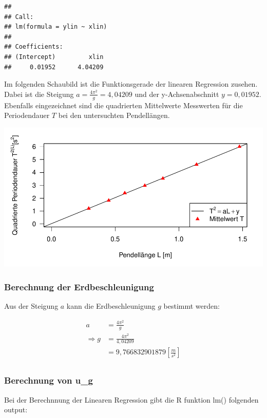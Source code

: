 \documentclass[
  9pt,
]{article}
\begin{document}
\begin{verbatim}
## 
## Call:
## lm(formula = ylin ~ xlin)
## 
## Coefficients:
## (Intercept)         xlin  
##     0.01952      4.04209
\end{verbatim}

Im folgenden Schaubild ist die Funktionsgerade der linearen Regression
zusehen. Dabei ist die Steigung \(a=\frac{4\pi^2}{g}=4,04209\) und der
y-Achsenabschnitt \(y=0,01952\). Ebenfalls eingezeichnet sind die
quadrierten Mittelwerte Messwerten für die Periodendauer \(T\) bei den
untersuchten Pendellängen.

\includegraphics{Pendel_files/figure-latex/unnamed-chunk-11-1.pdf}

\hypertarget{berechnung-der-erdbeschleunigung}{%
\subsubsection{Berechnung der
Erdbeschleunigung}\label{berechnung-der-erdbeschleunigung}}

Aus der Steigung \(a\) kann die Erdbeschleunigung \(g\) bestimmt werden:

\begin{align*}
a&= \frac{4\pi^2}{g}\\
\Rightarrow g &= \frac{4\pi^2}{4,04209}\\
 &= 9,766832901879 [\frac{m}{s^2}]\\
\end{align*}

\hypertarget{berechnung-von-u_g}{%
\subsubsection{Berechnung von u\_g}\label{berechnung-von-u_g}}

Bei der Berechnnung der Linearen Regression gibt die R funktion lm()
folgenden output:
\end{document}
